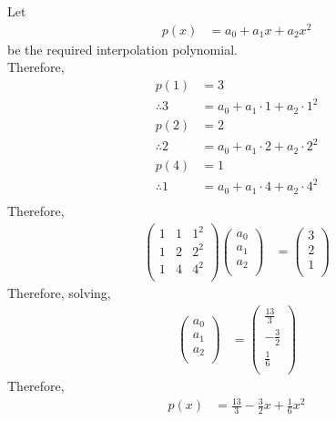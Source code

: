 \documentclass[fleqn, a4paper, 12pt, twoside]{article}
\theoremstyle{definition}
\theoremstyle{theorem}
\begin{document}
\begin{solution}
	Let
	\begin{align*}
		p(x) &= a_0 + a_1 x + a_2 x^2
	\end{align*}
	be the required interpolation polynomial.\\
	Therefore,
	\begin{align*}
		p(1) &= 3\\
		\therefore 3 &= a_0 + a_1 \cdot 1 + a_2 \cdot 1^2\\
		p(2) &= 2\\
		\therefore 2 &= a_0 + a_1 \cdot 2 + a_2 \cdot 2^2\\
		p(4) &= 1\\
		\therefore 1 &= a_0 + a_1 \cdot 4 + a_2 \cdot 4^2\\
	\end{align*}
	Therefore,
	\begin{align*}
			\begin{pmatrix}
				1 & 1 & 1^2\\
				1 & 2 & 2^2\\
				1 & 4 & 4^2\\
			\end{pmatrix}
			\begin{pmatrix}
				a_0\\
				a_1\\
				a_2\\
			\end{pmatrix}
		&=
			\begin{pmatrix}
				3\\
				2\\
				1\\
			\end{pmatrix}
	\end{align*}
	Therefore, solving,
	\begin{align*}
			\begin{pmatrix}
				a_0\\
				a_1\\
				a_2\\
			\end{pmatrix}
		&=
			\begin{pmatrix}
				\frac{13}{3}\\
				-\frac{3}{2}\\
				\frac{1}{6}\\
			\end{pmatrix}
	\end{align*}
	Therefore,
	\begin{align*}
		p(x) &= \frac{13}{3} - \frac{3}{2} x + \frac{1}{6} x^2
	\end{align*}
\end{solution}
\end{document}
